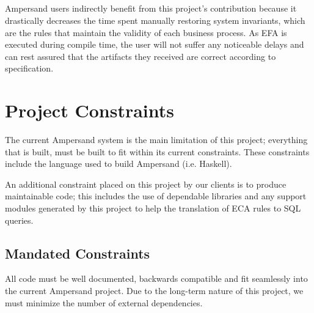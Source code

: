 \documentclass[12pt]{report}
\begin{document}
\paragraph{}
Ampersand users indirectly benefit from this project's contribution because it 
drastically decreases the time spent manually restoring system invariants, which 
are the rules that maintain the validity of each business process. 
As EFA is 
executed during compile time, the user will not suffer any noticeable delays 
and can rest assured that the artifacts they received are correct according to 
specification.

\chapter{Project Constraints}\label{ch:Constraints}
The current Ampersand system is the main limitation of this project; 
everything 
that is built, must be built to fit within its current constraints. These 
constraints include the language used to build Ampersand (i.e. Haskell). 

An additional constraint placed on 
this project by our clients is to produce maintainable 
code; this includes the use of dependable libraries and any support modules 
generated by this project to help the translation of ECA rules to SQL queries.

\section{Mandated Constraints}\label{sec:Constraints}

All code must be well documented, backwards compatible and fit seamlessly into 
the current Ampersand project. Due to the long-term nature of this project, we 
must minimize the number of external dependencies. 
\end{document}
